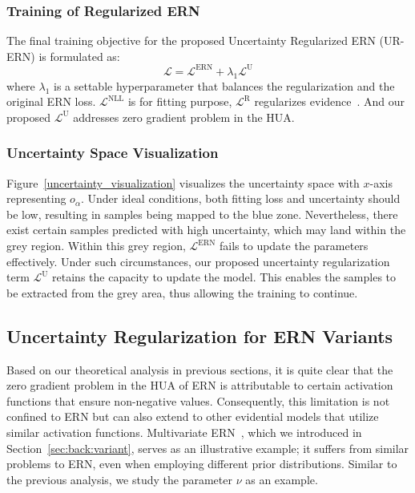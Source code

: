 \subsubsection{Training of Regularized ERN}
The final training objective for the proposed Uncertainty Regularized ERN (UR-ERN) is formulated as:
\begin{equation}
    \mathcal{L} = \mathcal{L}^{\mathrm{ERN}} +\lambda_{1} \mathcal{L}^{\mathrm{U}}
\end{equation}
where $\lambda_{1}$ is a settable hyperparameter that balances the regularization and the original ERN loss. $\mathcal{L}^{\mathrm{NLL}}$ is for fitting purpose, $\mathcal{L}^{\mathrm{R}}$ regularizes evidence~\cite{NEURIPS2020_aab08546}. And our proposed $\mathcal{L}^{\mathrm{U}}$ addresses zero gradient problem in the HUA. %

\subsubsection{Uncertainty Space Visualization}
Figure~\ref{uncertainty_visualization} visualizes the uncertainty space with $x$-axis representing $o_{\alpha}$. Under ideal conditions, both fitting loss and uncertainty should be low, resulting in samples being mapped to the blue zone. Nevertheless, there exist certain samples predicted with high uncertainty, which may land within the grey region. Within this grey region, $\mathcal{L}^{\mathrm{ERN}}$ fails to update the parameters effectively. Under such circumstances, our proposed uncertainty regularization term $\mathcal{L}^{\mathrm{U}}$ retains the capacity to update the model. This enables the samples to be extracted from the grey area, thus allowing the training to continue.


\subsection{Uncertainty Regularization for ERN Variants}
Based on our theoretical analysis in previous sections, it is quite clear that the zero gradient problem in the HUA of ERN is attributable to certain activation functions that ensure non-negative values. Consequently, this limitation is not confined to ERN but can also extend to other evidential models that utilize similar activation functions. Multivariate ERN~\cite{meinert2021multivariate}, which we introduced in Section~\ref{sec:back:variant}, serves as an illustrative example; it suffers from similar problems to ERN, even when employing different prior distributions. Similar to the previous analysis, we study the parameter $\nu$ as an example. 

